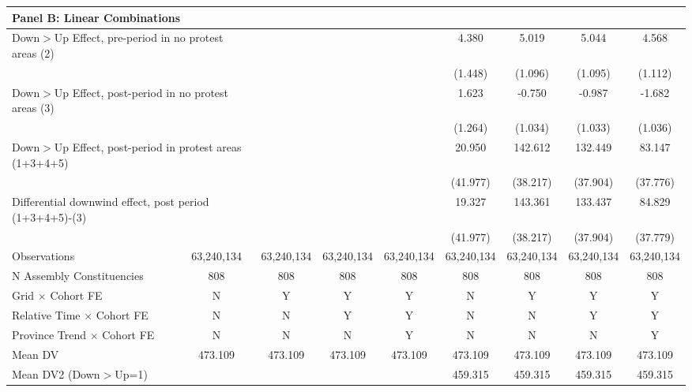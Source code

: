 {\begin{tabular}{l*{8}{c}}
\hline
\multicolumn{9}{l}{\textbf{Panel B: Linear Combinations}} \\ \hline
\multicolumn{2}{l}{Down$>$Up Effect, pre-period in no protest areas (2)}&            &            &            &4.380\sym{***}&5.019\sym{***}&5.044\sym{***}&4.568\sym{***}\\
\multicolumn{2}{l}{}&            &            &            &     (1.448)&     (1.096)&     (1.095)&     (1.112)\\
\multicolumn{2}{l}{Down$>$Up Effect, post-period in no protest areas (3)}&            &            &            &       1.623&      -0.750&      -0.987&      -1.682\\
\multicolumn{2}{l}{}&            &            &            &     (1.264)&     (1.034)&     (1.033)&     (1.036)\\
\multicolumn{2}{l}{Down$>$Up Effect, post-period in protest areas (1+3+4+5)}&            &            &            &      20.950&142.612\sym{***}&132.449\sym{***}&83.147\sym{**}\\
\multicolumn{2}{l}{}&            &            &            &    (41.977)&    (38.217)&    (37.904)&    (37.776)\\
\multicolumn{2}{l}{Differential downwind effect, post period (1+3+4+5)-(3)}&            &            &            &      19.327&143.361\sym{***}&133.437\sym{***}&84.829\sym{**}\\
\multicolumn{2}{l}{}&            &            &            &    (41.977)&    (38.217)&    (37.904)&    (37.779)\\



\hline
Observations&  63,240,134&  63,240,134&  63,240,134&  63,240,134&  63,240,134&  63,240,134&  63,240,134&  63,240,134\\
N Assembly Constituencies&         808&         808&         808&         808&         808&         808&         808&         808\\
Grid $\times$ Cohort FE&           N&           Y&           Y&           Y&           N&           Y&           Y&           Y\\
Relative Time $\times$ Cohort FE&           N&           N&           Y&           Y&           N&           N&           Y&           Y\\
Province Trend $\times$ Cohort FE&           N&           N&           N&           Y&           N&           N&           N&           Y\\
Mean DV     &     473.109&     473.109&     473.109&     473.109&     473.109&     473.109&     473.109&     473.109\\
Mean DV2 (Down$>$Up=1)&            &            &            &            &     459.315&     459.315&     459.315&     459.315\\
\hline
\end{tabular}
}
